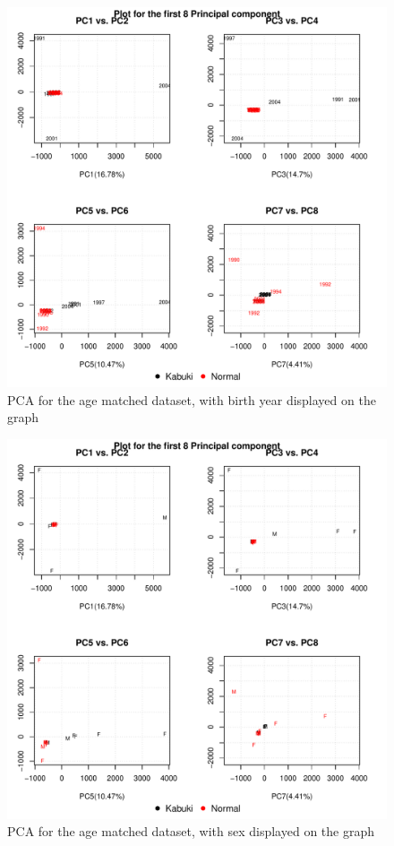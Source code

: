 \begin{figure}[!h]
    \centering
    \includegraphics[width=\textwidth]{figures/PCA/case_control/age_PCA.pdf}
    \caption{PCA for the age matched dataset, with birth year displayed on the graph}
    \label{fig:case_control-age}
\end{figure}

\begin{figure}[!h]
    \centering
    \includegraphics[width=\textwidth]{figures/PCA/case_control/sex_PCA.pdf}
    \caption{PCA for the age matched dataset, with sex displayed on the graph}
    \label{fig:case_control-sex}
\end{figure}




